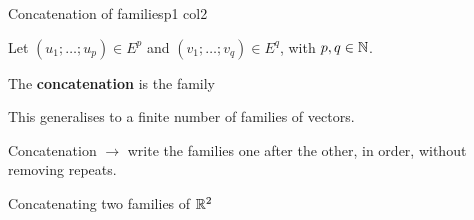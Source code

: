 \documentclass[course,noautoquant,noautokw]{neyvia-study}
\begin{document}
\begin{concept}[1.13]{Concatenation of families}{p1 col2}
\begin{definition}
\noindent Let $(u_1;\dots;u_p)\in E^p$ and $(v_1;\dots;v_q)\in E^q$, with $p,q\in\mathbb{N}$.
\par\noindent The \textbf{concatenation} is the family
\par\noindent This generalises to a finite number of families of vectors.
\end{definition}
\begin{reflex}
Concatenation \ensuremath{\rightarrow} write the families one after the other, in order, without removing repeats.
\end{reflex}
\begin{worked}{Concatenating two families of $\mathbb{R}^2$}
\end{worked}
\begin{traps}
\end{traps}
\end{concept}
\end{document}
